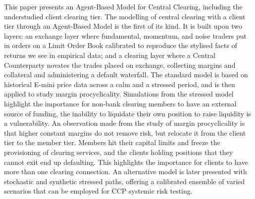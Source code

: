 This paper presents an Agent-Based Model for Central Clearing, including the understudied client clearing tier. The modelling of central clearing with a client tier through an Agent-Based Model is the first of its kind. It is built upon two layers: an exchange layer where fundamental, momentum, and noise traders put in orders on a Limit Order Book calibrated to reproduce the stylised facts of returns we see in empirical data; and a clearing layer where a Central Counterparty novates the trades placed on exchange, collecting margins and collateral and administering a default waterfall. The standard model is based on historical E-mini price data across a calm and a stressed period, and is then applied to study margin procyclicality. Simulations from the stressed model highlight the importance for non-bank clearing members to have an external source of funding, the inability to liquidate their own position to raise liquidity is a vulnerability. An observation made from the study of margin procyclicality is that higher constant margins do not remove risk, but relocate it from the client tier to the member tier. Members hit their capital limits and freeze the provisioning of clearing services, and the clients holding positions that they cannot exit end up defaulting. This highlights the importance for clients to have more than one clearing connection. An alternative model is later presented with stochastic and synthetic stressed paths, offering a calibrated ensemble of varied scenarios that can be employed for CCP systemic risk testing.